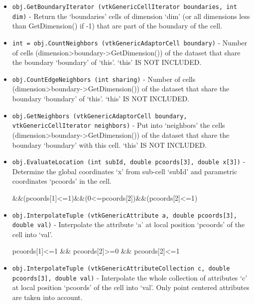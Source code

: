 \begin{itemize}
\item  \verb|obj.GetBoundaryIterator (vtkGenericCellIterator boundaries, int dim)| -  Return the `boundaries' cells of dimension `dim' (or all dimensions
 less than GetDimension() if -1) that are part of the boundary of the cell.
 
 

\item  \verb|int = obj.CountNeighbors (vtkGenericAdaptorCell boundary)| -  Number of cells (dimension>boundary->GetDimension()) of the dataset
 that share the boundary `boundary' of `this'.
 `this' IS NOT INCLUDED.
 
 
 
 
 

\item  \verb|obj.CountEdgeNeighbors (int sharing)| -  Number of cells (dimension>boundary->GetDimension()) of the dataset
 that share the boundary `boundary' of `this'.
 `this' IS NOT INCLUDED.
 
 
 
 
 

\item  \verb|obj.GetNeighbors (vtkGenericAdaptorCell boundary, vtkGenericCellIterator neighbors)| -  Put into `neighbors' the cells (dimension>boundary->GetDimension())
 of the dataset that share the boundary `boundary' with this cell.
 `this' IS NOT INCLUDED.
 
 
 
 
 

\item  \verb|obj.EvaluateLocation (int subId, double pcoords[3], double x[3])| -  Determine the global coordinates `x' from sub-cell `subId' and parametric
 coordinates `pcoords' in the cell.
 
 
 \&\&(pcoords[1]<=1)\&\&(0<=pcoords[2])\&\&(pcoords[2]<=1)

\item  \verb|obj.InterpolateTuple (vtkGenericAttribute a, double pcoords[3], double val)| -  Interpolate the attribute `a' at local position `pcoords' of the cell into
 `val'.
 
 
 
                     pcoords[1]<=1 \&\& pcoords[2]>=0 \&\& pcoords[2]<=1
 
 

\item  \verb|obj.InterpolateTuple (vtkGenericAttributeCollection c, double pcoords[3], double val)| -  Interpolate the whole collection of attributes `c' at local position
 `pcoords' of the cell into `val'. Only point centered attributes are
 taken into account.
 

\end{itemize}
